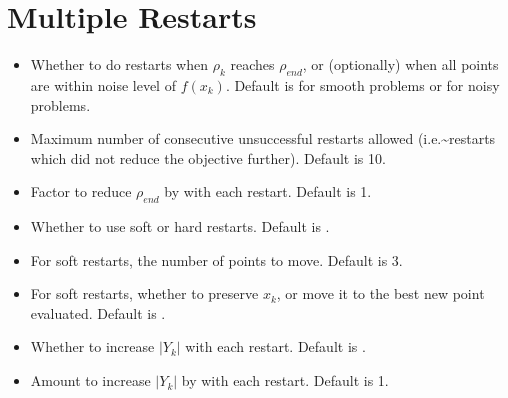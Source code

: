 \documentclass[letterpaper,10pt,english]{sphinxmanual}
\begin{document}
\section{Multiple Restarts}
\label{\detokenize{advanced:multiple-restarts}}\begin{itemize}
\item {} 
\sphinxAtStartPar
{} \sphinxhyphen{} Whether to do restarts when \(\rho_k\) reaches \(\rho_{end}\), or (optionally) when all points are within noise level of \(f(x_k)\). Default is  for smooth problems or  for noisy problems.

\item {} 
\sphinxAtStartPar
{} \sphinxhyphen{} Maximum number of consecutive unsuccessful restarts allowed (i.e.\textasciitilde{}restarts which did not reduce the objective further). Default is 10.

\item {} 
\sphinxAtStartPar
{} \sphinxhyphen{} Factor to reduce \(\rho_{end}\) by with each restart. Default is 1.

\item {} 
\sphinxAtStartPar
{} \sphinxhyphen{} Whether to use soft or hard restarts. Default is .

\item {} 
\sphinxAtStartPar
{} \sphinxhyphen{} For soft restarts, the number of points to move. Default is 3.

\item {} 
\sphinxAtStartPar
{} \sphinxhyphen{} For soft restarts, whether to preserve \(x_k\), or move it to the best new point evaluated. Default is .

\item {} 
\sphinxAtStartPar
{} \sphinxhyphen{} Whether to increase \(|Y_k|\) with each restart. Default is .

\item {} 
\sphinxAtStartPar
{} \sphinxhyphen{} Amount to increase \(|Y_k|\) by with each restart. Default is 1.


\end{itemize}
\end{document}
